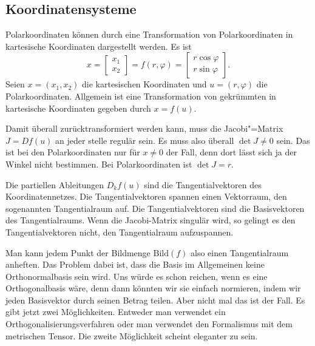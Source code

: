 \documentclass[a4paper,10pt,fleqn,twocolumn,twoside]{article}
\numberwithin{equation}{section}
\begin{document}
\subsection{Koordinatensysteme}

Polarkoordinaten können durch eine Transformation von
Polarkoordinaten in kartesische Koordinaten dargestellt werden.
Es ist
\begin{equation}
x = \begin{bmatrix}
x_1\\ x_2 \end{bmatrix}
= f(r,\varphi) = \begin{bmatrix}
r\cos\varphi\\
r\sin\varphi
\end{bmatrix}.
\end{equation}
Seien $x=(x_1,x_2)$ die kartesischen Koordinaten und
$u=(r,\varphi)$ die Polarkoordinaten. Allgemein ist eine
Transformation von gekrümmten in kartesische Koordinaten gegeben durch
$x=f(u).$

Damit überall zurücktransformiert werden kann, muss die
Jacobi"=Matrix $J=Df(u)$ an jeder stelle regulär sein. Es muss also
überall $\det J\neq 0$ sein. Das ist bei den Polarkoordinaten nur
für $x\neq 0$ der Fall, denn dort lässt sich ja der Winkel nicht
bestimmen. Bei Polarkoordinaten ist $\det J=r$.

Die partiellen Ableitungen $D_k f(u)$ sind die Tangentialvektoren
des Koordinatennetzes. Die Tangentialvektoren spannen einen
Vektorraum, den sogenannten Tangentialraum auf. Die
Tangentialvektoren sind die Basisvektoren des Tangentialraums.
Wenn die Jacobi-Matrix singulär wird, so gelingt es den
Tangentialvektoren nicht, den Tangentialraum aufzuspannen.

Man kann jedem Punkt der Bildmenge $\mathrm{Bild}(f)$ also einen
Tangentialraum anheften. Das Problem dabei ist, dass die Basis im
Allgemeinen keine Orthonormalbasis sein wird. Uns würde es schon
reichen, wenn es eine Orthogonalbasis wäre, denn dann könnten wir sie
einfach normieren, indem wir jeden Basisvektor durch seinen Betrag
teilen. Aber nicht mal das ist der Fall. Es gibt jetzt zwei
Möglichkeiten. Entweder man verwendet ein Orthogonalisierungsverfahren
oder man verwendet den Formalismus mit dem metrischen Tensor.
Die zweite Möglichkeit scheint eleganter zu sein.
\end{document}
